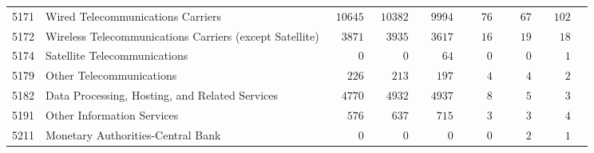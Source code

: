 \documentclass[9pt, oneside]{article}   	%
\begin{document}
\begin{longtable}{lp{3 in}ccccccc}
5171  & Wired Telecommunications Carriers & $\phantom{0}10645$ & $\phantom{0}10382$ & $\phantom{00}9994$ & $\phantom{000}76$ & $\phantom{000}67$ & $\phantom{00}102$ \\
5172  & Wireless Telecommunications Carriers (except Satellite) & $\phantom{00}3871$ & $\phantom{00}3935$ & $\phantom{00}3617$ & $\phantom{000}16$ & $\phantom{000}19$ & $\phantom{000}18$ \\
5174  & Satellite Telecommunications & $\phantom{00000}0$ & $\phantom{00000}0$ & $\phantom{0000}64$ & $\phantom{0000}0$ & $\phantom{0000}0$ & $\phantom{0000}1$ \\
5179  & Other Telecommunications & $\phantom{000}226$ & $\phantom{000}213$ & $\phantom{000}197$ & $\phantom{0000}4$ & $\phantom{0000}4$ & $\phantom{0000}2$ \\
5182  & Data Processing, Hosting, and Related Services & $\phantom{00}4770$ & $\phantom{00}4932$ & $\phantom{00}4937$ & $\phantom{0000}8$ & $\phantom{0000}5$ & $\phantom{0000}3$ \\
5191  & Other Information Services & $\phantom{000}576$ & $\phantom{000}637$ & $\phantom{000}715$ & $\phantom{0000}3$ & $\phantom{0000}3$ & $\phantom{0000}4$ \\
5211  & Monetary Authorities-Central Bank & $\phantom{00000}0$ & $\phantom{00000}0$ & $\phantom{00000}0$ & $\phantom{0000}0$ & $\phantom{0000}2$ & $\phantom{0000}1$ \\


\end{longtable}
\end{document}
